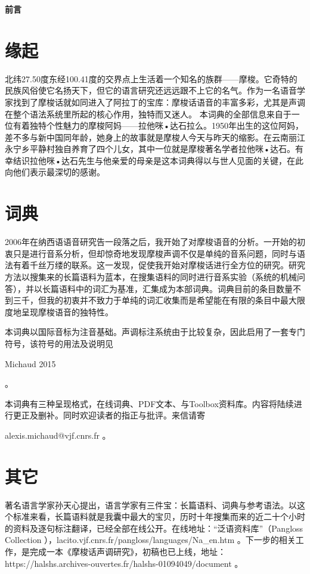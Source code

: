 \documentclass[oldfontcommands,oneside,a4paper,11pt]{article}
\newcommand{\zh}[1]{{\cn #1}}
\begin{document}
	\clearpage
	
	
	{\LARGE \textbf{\zh{前言}}}
	\section{ \zh{缘起}} \label{sec:language}
	
	\zh{北纬27.50度东经100.41度的交界点上生活着一个知名的族群——摩梭。它奇特的民族风俗使它名扬天下，但它的语言研究还远远跟不上它的名气。作为一名语音学家找到了摩梭话就如同进入了阿拉丁的宝库：摩梭话语音的丰富多彩，尤其是声调在整个语法系统里所起的核心作用，独特而又迷人。
		本词典的全部信息来自于一位有着独特个性魅力的摩梭阿妈——拉他咪•达石拉么。1950年出生的这位阿妈，差不多与新中国同年龄，她身上的故事就是摩梭人今天与昨天的缩影。在云南丽江永宁乡平静村独自养育了四个儿女，其中一位就是摩梭著名学者拉他咪•达石。有幸结识拉他咪•达石先生与他亲爱的母亲是这本词典得以与世人见面的关键，在此向他们表示最深切的感谢。}
	
	\section{ \zh{词典}} \label{sec:method}
	
	\zh{2006年在纳西语语音研究告一段落之后，我开始了对摩梭语音的分析。一开始的初衷只是进行音系分析，但却惊奇地发现摩梭声调不仅是单纯的音系问题，同时与语法有着千丝万缕的联系。这一发现，促使我开始对摩梭话进行全方位的研究。研究方法以搜集来的长篇语料为蓝本，在搜集语料的同时进行音系实验（系统的机械问答），并以长篇语料中的词汇为基准，汇集成为本部词典。词典目前的条目数量不到三千，但我的初衷并不致力于单纯的词汇收集而是希望能在有限的条目中最大限度地呈现摩梭语音的独特性。
		
		本词典以国际音标为注音基础。声调标注系统由于比较复杂，因此启用了一套专门符号，该符号的用法及说明见}Michaud 2015\zh{。
		
		本词典有三种呈现格式，在线词典、PDF文本、与Toolbox资料库。内容将陆续进行更正及删补。同时欢迎读者的指正与批评。来信请寄}alexis.michaud@vjf.cnrs.fr \zh{。}
	
	\section{ \zh{其它}} \label{sec:other}
	
	\zh{著名语言学家孙天心提出，语言学家有三件宝：长篇语料、词典与参考语法。以这个标准来看，长篇语料就是我囊中最大的宝贝，历时十年搜集而来的近二十个小时的资料及逐句标注翻译，已经全部在线公开。在线地址：“泛语资料库”（}Pangloss Collection \zh{），}lacito.vjf.cnrs.fr/pangloss/languages/Na\_en.htm \zh{。下一步的相关工作，是完成一本《摩梭话声调研究》，初稿也已上线，地址：}https://halshs.archives-ouvertes.fr/halshs-01094049/document \zh{。}
	
\end{document}
